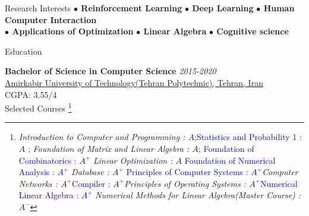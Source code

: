 \documentclass{resume} %
\begin{document}
	
	\begin{rSection}{Research Interests}
			\textbf{$\bullet$ Reinforcement Learning} \hspace*{16pt}
			\textbf{ $\bullet$ Deep Learning}\hspace*{16pt}
			\textbf{ $\bullet$ Human Computer Interaction}\hspace*{16pt}\\
			\textbf{ $\bullet$ Applications of Optimization}	\hspace*{16pt}	
			\textbf{ $\bullet$ Linear Algebra}\hspace*{16pt}
			\textbf{ $\bullet$ Cognitive science}\hspace*{16pt}


	\end{rSection}
	
	
	\begin{rSection}{Education}
		
		{\bf Bachelor of Science in Computer Science} \hfill {\em 2015-2020} \\ 
		\href{https://www.topuniversities.com/universities/amirkabir-university-technology}{\textcolor{coolblack}{Amirkabir University of Technology(Tehran Polytechnic), Tehran, Iran} }\\
		CGPA: 3.55/4\\
				Selected Courses
		\footnote{\textit{Introduction to Computer and Programming : $A$};\textcolor{blue}{Statistics and Probability 1 : $A$ }; \textit{Foundation of Matrix and Linear Algebra : $A$}; \textcolor{blue}{Foundation of Combinatorics : $A^{+}$} \textit{Linear Optimization : $A$} \textcolor{blue}{Foundation of Numerical Analysis : $A^{+}$} \textit{Database : $A^{+}$} \textcolor{blue}{Principles of Computer Systems : $A^{+}$}\textit{Computer Networks : $A^{+}$}\textcolor{blue}{Compiler : $A^{+}$}\textit{Principles of Operating Systems : $A^{+}$}\textcolor{blue}{Numerical Linear Algebra : $A^{+}$} \textit{Numerical Methods for Linear Algebra(Master Course) : $A^{-}$ }}
		\\
	
	\end{rSection}
%		
	
\end{document}
